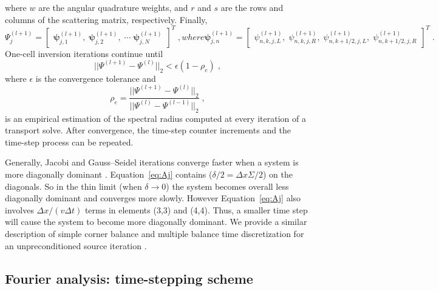 where $w$ are the angular quadrature weights, and $r$ and $s$ are the rows and columns of the scattering matrix, respectively.
Finally,
\begin{subequations}
\label{eq:x_vec}
\begin{equation}
\Psi^{(l+1)}_j =  \begin{bmatrix}
    \bm{\psi}_{j,1}^{(l+1)}, \;
    \bm{\psi}_{j,2}^{(l+1)}, \;
    \cdots \;
    \bm{\psi}_{j,N}^{(l+1)}
    \end{bmatrix} ^{T} \; ,
\end{equation}
where
\begin{equation} 
\bm{\psi}_{j,n}^{(l+1)} = \begin{bmatrix}
    \psi_{n,k,j,L}^{(l+1)}, \;
    \psi_{n,k,j,R}^{(l+1)}, \;
    \psi_{n,k+1/2,j,L}^{(l+1)}, \;
    \psi_{n,k+1/2,j,R}^{(l+1)}
    \end{bmatrix}^{T} \;.
\end{equation}
\end{subequations}
One-cell inversion iterations continue until
\begin{equation}
    ||\Psi^{(l+1)}-\Psi^{(l)}||_{2} < \epsilon(1-\rho_e) \; ,
\end{equation}
where $\epsilon$ is the convergence tolerance and
\begin{equation}
    \rho_e = \frac{||\Psi^{(l+1)}-\Psi^{(l)}||_{2}}{||\Psi^{(l)}-\Psi^{(l-1)}||_{2}} \; ,
\end{equation}
is an empirical estimation of the spectral radius computed at every iteration of a transport solve.
After convergence, the time-step counter increments and the time-step process can be repeated.

Generally, Jacobi and Gauss--Seidel iterations converge faster when a system is more diagonally dominant \cite{isaacson_numerical_1966, golub_matrix_1983}.
Equation~\eqref{eq:Aj} contains ($ \delta/2 = \Delta x\Sigma/2 $) on the diagonals.
So in the thin limit (when $\delta\rightarrow 0$) the system becomes overall less diagonally dominant and converges more slowly.
However Equation~\eqref{eq:Aj} also involves $\Delta x/(v\Delta t)$ terms in elements (3,3) and (4,4).
Thus, a smaller time step will cause the system to become more diagonally dominant.
We provide a similar description of simple corner balance and multiple balance time discretization for an unpreconditioned source iteration \cite{morgan2023oci}.

\subsection{Fourier analysis: time-stepping scheme}

